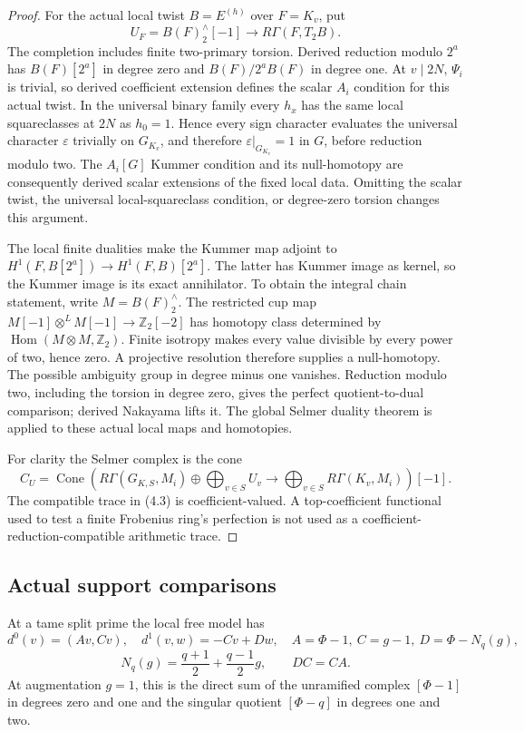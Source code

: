 \documentclass[11pt]{article}
\theoremstyle{definition}
\theoremstyle{remark}
\newcommand{\Z}{\mathbb Z}
\begin{document}
\begin{proof}\leavevmode
For the actual local twist $B=E^{(h)}$ over $F=K_v$, put
\[
 U_F=B(F)^\wedge_2[-1]\longrightarrow R\Gamma(F,T_2B).
\]
The completion includes finite two-primary torsion. Derived reduction
modulo $2^a$ has $B(F)[2^a]$ in degree zero and
$B(F)/2^aB(F)$ in degree one. At $v\mid2N$, $\Psi_i$ is trivial,
so derived coefficient extension defines the scalar $A_i$ condition
for this actual twist. In the universal binary family every $h_x$
has the same local squareclasses at $2N$ as $h_0=1$. Hence every
sign character evaluates the universal character $\varepsilon$
trivially on $G_{K_v}$, and therefore $\varepsilon|_{G_{K_v}}=1$
in $G$, before reduction modulo two. The $A_i[G]$ Kummer condition
and its null-homotopy are consequently derived scalar extensions
of the fixed local data. Omitting the scalar twist, the universal
local-squareclass condition, or degree-zero torsion changes this argument.

The local finite dualities \cite[I.2.3, I.3.2--I.3.5]{milne} make the
Kummer map adjoint to $H^1(F,B[2^a])\to H^1(F,B)[2^a]$.
The latter has Kummer image as kernel, so the Kummer image is its exact
annihilator. To obtain the integral chain statement, write
$M=B(F)^\wedge_2$. The restricted cup map
$M[-1]\otimes^LM[-1]\to\Z_2[-2]$ has homotopy class determined by
$\operatorname{Hom}(M\otimes M,\Z_2)$. Finite isotropy makes every
value divisible by every power of two, hence zero.
A projective resolution therefore supplies a null-homotopy.
The possible ambiguity group in degree minus one vanishes.
Reduction modulo two, including the torsion in degree zero, gives the
perfect quotient-to-dual comparison; derived Nakayama lifts it.
The global Selmer duality theorem
\cite[Sections 5.1, 5.2.4, 5.4.3 and 6.3.4]{nekovar} is applied
to these actual local maps and homotopies.

For clarity the Selmer complex is the cone
\[
 C_U=\operatorname{Cone}\left(
 R\Gamma(G_{K,S},M_i)\oplus\bigoplus_{v\in S}U_v
 \longrightarrow\bigoplus_{v\in S}R\Gamma(K_v,M_i)\right)[-1].
                                                                    \tag{4.3}
\]
The compatible trace in (4.3) is coefficient-valued. A top-coefficient
functional used to test a finite Frobenius ring's perfection is not
used as a coefficient-reduction-compatible arithmetic trace.
\end{proof}

\subsection{Actual support comparisons}
At a tame split prime the local free model has
\[
 d^0(v)=(Av,Cv),\quad d^1(v,w)=-Cv+Dw,\quad
 A=\Phi-1,\ C=g-1,\ D=\Phi-N_q(g),
\]
\[
 N_q(g)=\frac{q+1}{2}+\frac{q-1}{2}g,\qquad DC=CA.                 \tag{4.4}
\]
At augmentation $g=1$, this is the direct sum of the unramified
complex $[\Phi-1]$ in degrees zero and one and the singular quotient
$[\Phi-q]$ in degrees one and two.
\end{document}
